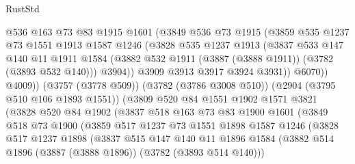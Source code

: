 \begin{lexlean}{RustStd}
\begin{coremodule}
                      @536
                      @163
                      @73
                      @83
                      @1915
                      @1601
                      (@3849
                        @536
                        @73
                        @1915
                        (@3859
                          @535
                          @1237
                          @73
                          @1551
                          @1913
                          @1587
                          @1246
                          (@3828
                            @535
                            @1237
                            @1913
                            (@3837
                              @533
                              @147
                              @140
                              @11
                              @1911
                              @1584
                              (@3882 @532 @1911 (@3887 (@3888 @1911)) (@3782 (@3893 @532 @140)))
                              @3904))
                          @3909
                          @3913
                          @3917
                          @3924
                          @3931))
                      @6070))
                  @4009))
              (@3757 (@3778 @509))
              (@3782 (@3786 @3008 @510))
              (@2904 (@3795 @510 @106 @1893 @1551))
              (@3809
                @520
                @84
                @1551
                @1902
                @1571
                @3821
                (@3828
                  @520
                  @84
                  @1902
                  (@3837
                    @518
                    @163
                    @73
                    @83
                    @1900
                    @1601
                    (@3849
                      @518
                      @73
                      @1900
                      (@3859
                        @517
                        @1237
                        @73
                        @1551
                        @1898
                        @1587
                        @1246
                        (@3828
                          @517
                          @1237
                          @1898
                          (@3837
                            @515
                            @147
                            @140
                            @11
                            @1896
                            @1584
                            (@3882 @514 @1896 (@3887 (@3888 @1896)) (@3782 (@3893 @514 @140)))

\end{coremodule}
\end{lexlean}

